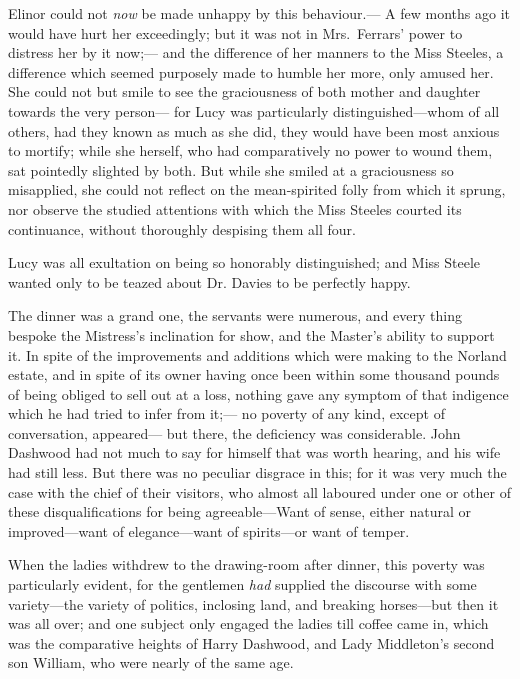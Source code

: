 Elinor could not \emph{now} be made unhappy by this behaviour.---%
A few months ago it would have hurt her exceedingly; but it
was not in Mrs.\ Ferrars' power to distress her by it now;---%
and the difference of her manners to the Miss Steeles,
a difference which seemed purposely made to humble her more,
only amused her.  She could not but smile to see the graciousness
of both mother and daughter towards the very person---%
for Lucy was particularly distinguished---whom of all others,
had they known as much as she did, they would have been most
anxious to mortify; while she herself, who had comparatively
no power to wound them, sat pointedly slighted by both.
But while she smiled at a graciousness so misapplied,
she could not reflect on the mean-spirited folly from
which it sprung, nor observe the studied attentions
with which the Miss Steeles courted its continuance,
without thoroughly despising them all four.

Lucy was all exultation on being so honorably
distinguished; and Miss Steele wanted only to be teazed
about Dr. Davies to be perfectly happy.

The dinner was a grand one, the servants were numerous,
and every thing bespoke the Mistress's inclination
for show, and the Master's ability to support it.
In spite of the improvements and additions which were
making to the Norland estate, and in spite of its owner
having once been within some thousand pounds of being
obliged to sell out at a loss, nothing gave any symptom
of that indigence which he had tried to infer from it;---%
no poverty of any kind, except of conversation, appeared---%
but there, the deficiency was considerable.  John Dashwood
had not much to say for himself that was worth hearing,
and his wife had still less.  But there was no peculiar
disgrace in this; for it was very much the case with
the chief of their visitors, who almost all laboured
under one or other of these disqualifications for being
agreeable---Want of sense, either natural or improved---want
of elegance---want of spirits---or want of temper.

When the ladies withdrew to the drawing-room
after dinner, this poverty was particularly evident,
for the gentlemen \emph{had} supplied the discourse with some
variety---the variety of politics, inclosing land,
and breaking horses---but then it was all over; and one
subject only engaged the ladies till coffee came in,
which was the comparative heights of Harry Dashwood,
and Lady Middleton's second son William, who were nearly
of the same age.

